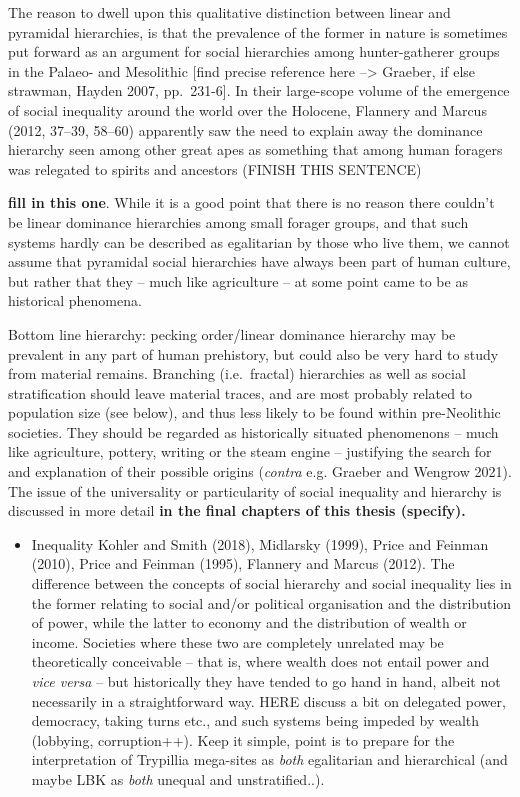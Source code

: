 \documentclass[
  12pt,
  a4paper, twoside]{book}
\providecommand{\tightlist}{%
  \setlength{\itemsep}{0pt}\setlength{\parskip}{0pt}}
\begin{document}
The reason to dwell upon this qualitative distinction between linear and pyramidal hierarchies, is that the prevalence of the former in nature is sometimes put forward as an argument for social hierarchies among hunter-gatherer groups in the Palaeo- and Mesolithic {[}find precise reference here --\textgreater{} Graeber, if else strawman, Hayden 2007, pp.~231-6{]}. In their large-scope volume of the emergence of social inequality around the world over the Holocene, Flannery and Marcus (2012, 37--39, 58--60) apparently saw the need to explain away the dominance hierarchy seen among other great apes as something that among human foragers was relegated to spirits and ancestors (FINISH THIS SENTENCE)

\textbf{fill in this one}. While it is a good point that there is no reason there couldn't be linear dominance hierarchies among small forager groups, and that such systems hardly can be described as egalitarian by those who live them, we cannot assume that pyramidal social hierarchies have always been part of human culture, but rather that they -- much like agriculture -- at some point came to be as historical phenomena.

Bottom line hierarchy: pecking order/linear dominance hierarchy may be prevalent in any part of human prehistory, but could also be very hard to study from material remains. Branching (i.e.~fractal) hierarchies as well as social stratification should leave material traces, and are most probably related to population size (see below), and thus less likely to be found within pre-Neolithic societies. They should be regarded as historically situated phenomenons -- much like agriculture, pottery, writing or the steam engine -- justifying the search for and explanation of their possible origins (\emph{contra} e.g. Graeber and Wengrow 2021). The issue of the universality or particularity of social inequality and hierarchy is discussed in more detail \textbf{in the final chapters of this thesis (specify).}

\begin{itemize}
\tightlist
\item
  Inequality Kohler and Smith (2018), Midlarsky (1999), Price and Feinman (2010), Price and Feinman (1995), Flannery and Marcus (2012). The difference between the concepts of social hierarchy and social inequality lies in the former relating to social and/or political organisation and the distribution of power, while the latter to economy and the distribution of wealth or income. Societies where these two are completely unrelated may be theoretically conceivable -- that is, where wealth does not entail power and \emph{vice versa} -- but historically they have tended to go hand in hand, albeit not necessarily in a straightforward way. HERE discuss a bit on delegated power, democracy, taking turns etc., and such systems being impeded by wealth (lobbying, corruption++). Keep it simple, point is to prepare for the interpretation of Trypillia mega-sites as \emph{both} egalitarian and hierarchical (and maybe LBK as \emph{both} unequal and unstratified..).
\end{itemize}
\end{document}
